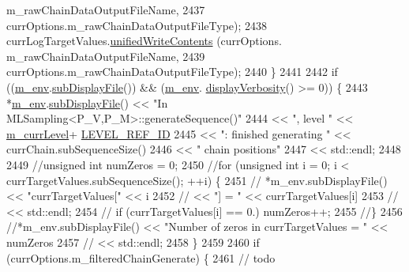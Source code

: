 \begin{DoxyCode}
      m\_rawChainDataOutputFileName,
2437                                                      currOptions.m\_rawChainDataOutputFileType);
2438         currLogTargetValues.\hyperlink{class_q_u_e_s_o_1_1_scalar_sequence_a2f832dd5eda37df06eb52650ab8ce733}{unifiedWriteContents}    (currOptions.
      m\_rawChainDataOutputFileName,
2439                                                      currOptions.m\_rawChainDataOutputFileType);
2440       \}
2441 
2442       \textcolor{keywordflow}{if} ((\hyperlink{class_q_u_e_s_o_1_1_m_l_sampling_a13f1ca4fe9f94822fe572a743eaced1d}{m\_env}.\hyperlink{class_q_u_e_s_o_1_1_base_environment_a8a0064746ae8dddfece4229b9ad374d6}{subDisplayFile}()) && (\hyperlink{class_q_u_e_s_o_1_1_m_l_sampling_a13f1ca4fe9f94822fe572a743eaced1d}{m\_env}.
      \hyperlink{class_q_u_e_s_o_1_1_base_environment_a1fe5f244fc0316a0ab3e37463f108b96}{displayVerbosity}() >= 0)) \{
2443         *\hyperlink{class_q_u_e_s_o_1_1_m_l_sampling_a13f1ca4fe9f94822fe572a743eaced1d}{m\_env}.\hyperlink{class_q_u_e_s_o_1_1_base_environment_a8a0064746ae8dddfece4229b9ad374d6}{subDisplayFile}() << \textcolor{stringliteral}{"In MLSampling<P\_V,P\_M>::generateSequence()"}
2444                                 << \textcolor{stringliteral}{", level "} << \hyperlink{class_q_u_e_s_o_1_1_m_l_sampling_af9416874c856e50f3b35270e801f17e4}{m\_currLevel}+
      \hyperlink{_m_l_sampling_level_options_8h_a68d15eaf394d210effcf584b938206d3}{LEVEL\_REF\_ID}
2445                                 << \textcolor{stringliteral}{": finished generating "} << currChain.subSequenceSize()
2446                                 << \textcolor{stringliteral}{" chain positions"}
2447                                 << std::endl;
2448 
2449         \textcolor{comment}{//unsigned int numZeros = 0;}
2450         \textcolor{comment}{//for (unsigned int i = 0; i < currTargetValues.subSequenceSize(); ++i) \{}
2451         \textcolor{comment}{//  *m\_env.subDisplayFile() << "currTargetValues[" << i}
2452         \textcolor{comment}{//                          << "] = " << currTargetValues[i]}
2453         \textcolor{comment}{//                          << std::endl;}
2454         \textcolor{comment}{//  if (currTargetValues[i] == 0.) numZeros++;}
2455         \textcolor{comment}{//\}}
2456         \textcolor{comment}{//*m\_env.subDisplayFile() << "Number of zeros in currTargetValues = " << numZeros}
2457         \textcolor{comment}{//                        << std::endl;}
2458       \}
2459 
2460       \textcolor{keywordflow}{if} (currOptions.m\_filteredChainGenerate) \{
2461         \textcolor{comment}{// todo}

\end{DoxyCode}
